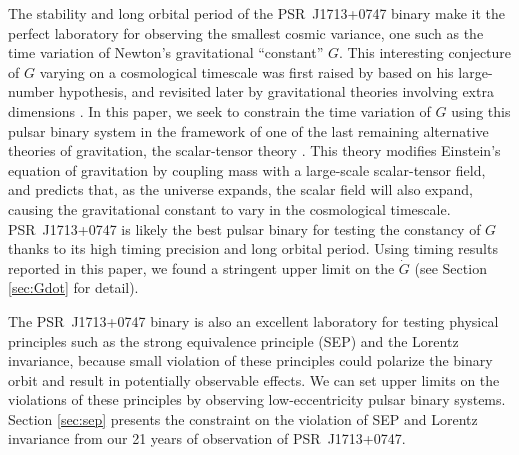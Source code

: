 The stability and long orbital period of the PSR~J1713+0747 binary make it the
perfect laboratory for observing the smallest cosmic variance, 
one such as the time variation of Newton's gravitational ``constant'' $G$. 
This interesting conjecture of $G$ varying on a cosmological timescale was first 
raised by \citet{dir37} based on his large-number hypothesis, and 
revisited later by gravitational theories involving extra dimensions
\citep{mar84,ww86a}.
In this paper, we seek to constrain the time variation of $G$ using this pulsar
binary system in the framework of one of the last remaining alternative theories of gravitation, the scalar-tensor theory \citep{jor59,fie56,bd61}. 
This theory modifies Einstein's equation of gravitation by coupling mass with
a large-scale scalar-tensor field, and predicts that, as the universe expands,
the scalar field will also expand, causing the gravitational constant to vary  
in the cosmological timescale. 
PSR~J1713+0747 is likely the best pulsar binary for testing the constancy of
$G$ thanks to its high timing precision and long orbital period. Using timing
results reported in this paper, we found a stringent upper limit on the
$\dot{G}$ (see Section \ref{sec:Gdot} for detail). 

The PSR~J1713+0747 binary is also an excellent laboratory for testing physical 
principles such as the strong equivalence principle (SEP) and the Lorentz invariance, because small violation of these principles could polarize the
binary orbit and result in potentially observable effects. We can set
upper limits on the violations of these principles by observing
low-eccentricity pulsar binary systems. Section \ref{sec:sep} presents the
constraint on the violation of SEP and Lorentz invariance from our 21 years of observation of PSR~J1713+0747.

